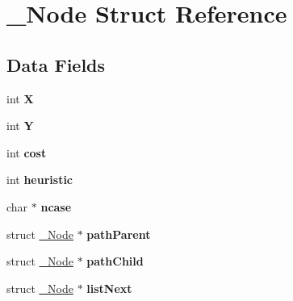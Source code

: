 \hypertarget{struct___node}{}\section{\+\_\+\+Node Struct Reference}
\label{struct___node}
\subsection*{Data Fields}
\begin{DoxyCompactItemize}
\item 
int {\bfseries X}\hypertarget{struct___node_a80c0944640e62d3ed6c5419c1bcc0c88}{}\label{struct___node_a80c0944640e62d3ed6c5419c1bcc0c88}

\item 
int {\bfseries Y}\hypertarget{struct___node_aa482c4cc86a24474e4fb19b5b5978778}{}\label{struct___node_aa482c4cc86a24474e4fb19b5b5978778}

\item 
int {\bfseries cost}\hypertarget{struct___node_a66700f11d42fee2413e58dbf49c43ee1}{}\label{struct___node_a66700f11d42fee2413e58dbf49c43ee1}

\item 
int {\bfseries heuristic}\hypertarget{struct___node_a266b59afb2a9e30cb84c2b14388fb5fe}{}\label{struct___node_a266b59afb2a9e30cb84c2b14388fb5fe}

\item 
char $\ast$ {\bfseries ncase}\hypertarget{struct___node_aa0cc47f15f87b45c6960e18fd786f286}{}\label{struct___node_aa0cc47f15f87b45c6960e18fd786f286}

\item 
struct \hyperlink{struct___node}{\+\_\+\+Node} $\ast$ {\bfseries path\+Parent}\hypertarget{struct___node_a7d0cf1a91c4dd335673a79aa5db87d01}{}\label{struct___node_a7d0cf1a91c4dd335673a79aa5db87d01}

\item 
struct \hyperlink{struct___node}{\+\_\+\+Node} $\ast$ {\bfseries path\+Child}\hypertarget{struct___node_ac1bcf3cc6dca353ea81f1e92b01d7ecb}{}\label{struct___node_ac1bcf3cc6dca353ea81f1e92b01d7ecb}

\item 
struct \hyperlink{struct___node}{\+\_\+\+Node} $\ast$ {\bfseries list\+Next}\hypertarget{struct___node_a92b940ae1bafab81f2c09dcb727b2759}{}\label{struct___node_a92b940ae1bafab81f2c09dcb727b2759}

\end{DoxyCompactItemize}


